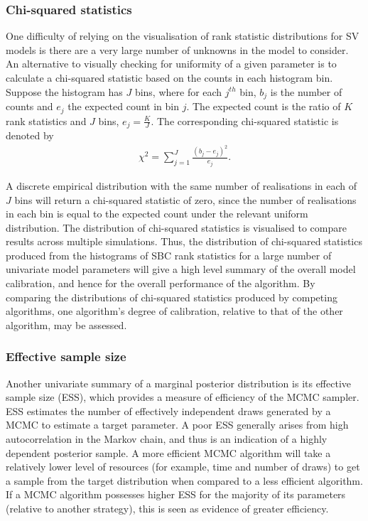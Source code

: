 \documentclass[12pt, a4paper]{article}
\begin{document}
            \subsubsection{Chi-squared statistics}
            One difficulty of relying on the visualisation of rank statistic distributions for SV models is there are a very large number of unknowns in the model to consider. An alternative to visually checking for uniformity of a given parameter is to calculate a chi-squared statistic based on the counts in each histogram bin. Suppose the histogram has $J$ bins, where for each $j^{th}$ bin, $b_j$ is the number of counts and $e_j$ the expected count in bin $j$. The expected count is the ratio of $K$ rank statistics and $J$ bins, $e_j=\frac{K}{J}$. The corresponding chi-squared statistic is denoted by
            \begin{align}
            \chi^2 = \sum_{j=1}^J \frac{(b_{j} - e_{j})^2}{e_j}.
            \end{align}
            
            A discrete empirical distribution with the same number of realisations in each of $J$ bins will return a chi-squared statistic of zero, since the number of realisations in each bin is equal to the expected count under the relevant  uniform distribution. The distribution of chi-squared statistics is visualised to compare results across multiple simulations. Thus, the distribution of chi-squared statistics produced from the histograms of SBC rank statistics for a large number of univariate model parameters will give a high level summary of the overall model calibration, and hence for the overall performance of the algorithm. By comparing the distributions of chi-squared statistics produced by competing algorithms, one algorithm's degree of calibration, relative to that of the other algorithm, may be assessed. 

            \subsubsection{Effective sample size}
            Another univariate summary of a marginal posterior distribution is its effective sample size (ESS), which provides a measure of efficiency of the MCMC sampler. ESS estimates the number of effectively independent draws generated by a MCMC to estimate a target parameter. A poor ESS generally arises from high autocorrelation in the Markov chain, and thus is an indication of a highly dependent posterior sample. A more efficient MCMC algorithm will take a relatively lower level of resources (for example, time and number of draws) to get a sample from the target distribution when compared to a less efficient algorithm. If a MCMC algorithm possesses higher ESS for the majority of its parameters (relative to another strategy), this is seen as evidence of greater efficiency.
            
\end{document}
